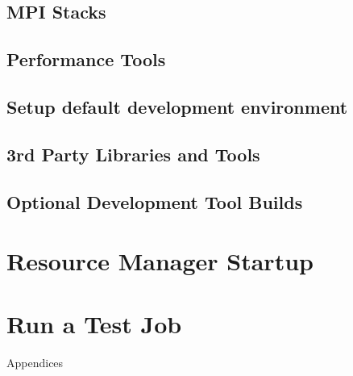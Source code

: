 \documentclass[letterpaper]{article}
\begin{document}
\subsection{MPI Stacks} \label{sec:mpi}


\subsection{Performance Tools} \label{sec:install_perf_tools}


\subsection{Setup default development environment}


\subsection{3rd Party Libraries and Tools} \label{sec:3rdparty}





\subsection{Optional Development Tool Builds} \label{sec:3rdparty_intel}


\vspace*{0.2cm}
\section{Resource Manager Startup} \label{sec:rms_startup}


\section{Run a Test Job} \label{sec:test_job}


\clearpage
\appendix
{\bf \LARGE \centerline{Appendices}} \vspace*{0.2cm}

\renewcommand{\thesubsection}{\Alph{subsection}}







\end{document}
